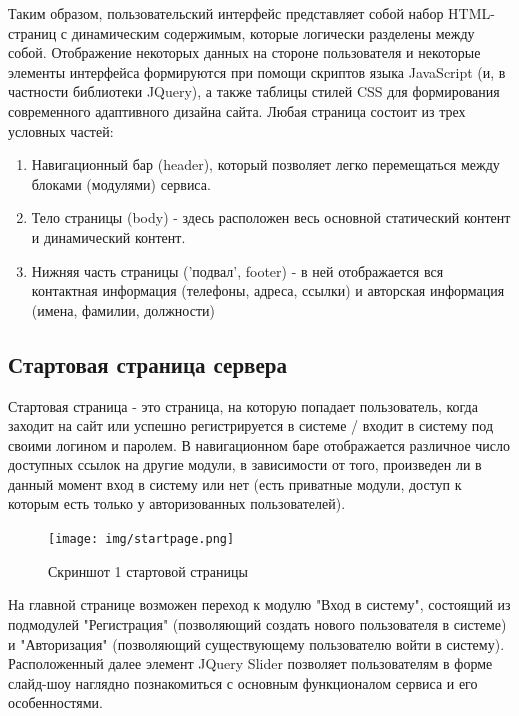 Таким образом, пользовательский интерфейс представляет собой набор HTML-страниц с динамическим содержимым, которые логически разделены между собой. Отображение некоторых данных на стороне пользователя и некоторые элементы интерфейса формируются при помощи скриптов языка JavaScript (и, в частности библиотеки JQuery), а также таблицы стилей CSS для формирования современного адаптивного дизайна сайта. Любая страница состоит из трех условных частей:
\begin{enumerate}
\item Навигационный бар (header), который позволяет легко перемещаться между блоками (модулями) сервиса.
\item Тело страницы (body) - здесь расположен весь основной статический контент и динамический контент.
\item Нижняя часть страницы ('подвал', footer) - в ней отображается вся контактная информация (телефоны, адреса, ссылки) и авторская информация (имена, фамилии, должности)
\end{enumerate}
\subsection{Стартовая страница сервера}

Стартовая страница - это страница, на которую попадает пользователь, когда заходит на сайт или успешно регистрируется в системе / входит в систему под своими логином и паролем. В навигационном баре отображается различное число доступных ссылок на другие модули, в зависимости от того, произведен ли в данный момент вход в систему или нет (есть приватные модули, доступ к которым есть только у авторизованных пользователей).

\begin{figure}%
	\centering
	\texttt{[image: img/startpage.png]}
	\caption{\label{fig:tan-aus}Скриншот 1 стартовой страницы}
\end{figure}

На главной странице возможен переход к модулю "Вход в систему", состоящий из подмодулей "Регистрация" (позволяющий создать нового пользователя в системе) и "Авторизация" (позволяющий существующему пользователю войти в систему). Расположенный далее элемент JQuery Slider позволяет пользователям в форме слайд-шоу наглядно познакомиться с основным функционалом сервиса и его особенностями.

